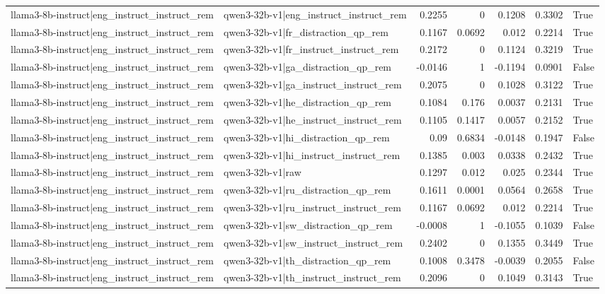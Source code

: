 \begin{table}
\begin{tabular}{l l r r r r l}
llama3-8b-instruct|eng_instruct_instruct_rem & qwen3-32b-v1|eng_instruct_instruct_rem & 0.2255 & 0 & 0.1208 & 0.3302 & True \\
llama3-8b-instruct|eng_instruct_instruct_rem & qwen3-32b-v1|fr_distraction_qp_rem & 0.1167 & 0.0692 & 0.012 & 0.2214 & True \\
llama3-8b-instruct|eng_instruct_instruct_rem & qwen3-32b-v1|fr_instruct_instruct_rem & 0.2172 & 0 & 0.1124 & 0.3219 & True \\
llama3-8b-instruct|eng_instruct_instruct_rem & qwen3-32b-v1|ga_distraction_qp_rem & -0.0146 & 1 & -0.1194 & 0.0901 & False \\
llama3-8b-instruct|eng_instruct_instruct_rem & qwen3-32b-v1|ga_instruct_instruct_rem & 0.2075 & 0 & 0.1028 & 0.3122 & True \\
llama3-8b-instruct|eng_instruct_instruct_rem & qwen3-32b-v1|he_distraction_qp_rem & 0.1084 & 0.176 & 0.0037 & 0.2131 & True \\
llama3-8b-instruct|eng_instruct_instruct_rem & qwen3-32b-v1|he_instruct_instruct_rem & 0.1105 & 0.1417 & 0.0057 & 0.2152 & True \\
llama3-8b-instruct|eng_instruct_instruct_rem & qwen3-32b-v1|hi_distraction_qp_rem & 0.09 & 0.6834 & -0.0148 & 0.1947 & False \\
llama3-8b-instruct|eng_instruct_instruct_rem & qwen3-32b-v1|hi_instruct_instruct_rem & 0.1385 & 0.003 & 0.0338 & 0.2432 & True \\
llama3-8b-instruct|eng_instruct_instruct_rem & qwen3-32b-v1|raw & 0.1297 & 0.012 & 0.025 & 0.2344 & True \\
llama3-8b-instruct|eng_instruct_instruct_rem & qwen3-32b-v1|ru_distraction_qp_rem & 0.1611 & 0.0001 & 0.0564 & 0.2658 & True \\
llama3-8b-instruct|eng_instruct_instruct_rem & qwen3-32b-v1|ru_instruct_instruct_rem & 0.1167 & 0.0692 & 0.012 & 0.2214 & True \\
llama3-8b-instruct|eng_instruct_instruct_rem & qwen3-32b-v1|sw_distraction_qp_rem & -0.0008 & 1 & -0.1055 & 0.1039 & False \\
llama3-8b-instruct|eng_instruct_instruct_rem & qwen3-32b-v1|sw_instruct_instruct_rem & 0.2402 & 0 & 0.1355 & 0.3449 & True \\
llama3-8b-instruct|eng_instruct_instruct_rem & qwen3-32b-v1|th_distraction_qp_rem & 0.1008 & 0.3478 & -0.0039 & 0.2055 & False \\
llama3-8b-instruct|eng_instruct_instruct_rem & qwen3-32b-v1|th_instruct_instruct_rem & 0.2096 & 0 & 0.1049 & 0.3143 & True \\

\end{tabular}
\end{table}
